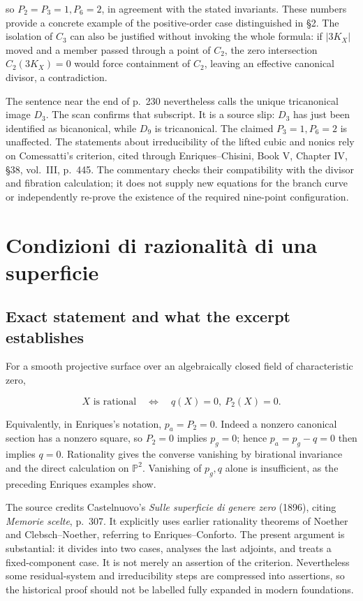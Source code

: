 so \(P_2=P_3=1,P_6=2\), in agreement with the stated invariants. These numbers provide a concrete example of the positive-order case distinguished in §2. The isolation of \(C_3\) can also be justified without invoking the whole formula: if \(|3K_X|\) moved and a member passed through a point of \(C_2\), the zero intersection \(C_2(3K_X)=0\) would force containment of \(C_2\), leaving an effective canonical divisor, a contradiction.

The sentence near the end of p.~230 nevertheless calls the unique tricanonical image \(D_3\). The scan confirms that subscript. It is a source slip: \(D_3\) has just been identified as bicanonical, while \(D_9\) is tricanonical. The claimed \(P_3=1,P_6=2\) is unaffected. The statements about irreducibility of the lifted cubic and nonics rely on Comessatti's criterion, cited through Enriques--Chisini, Book V, Chapter IV, §38, vol.~III, p.~445. The commentary checks their compatibility with the divisor and fibration calculation; it does not supply new equations for the branch curve or independently re-prove the existence of the required nine-point configuration.

\section{Condizioni di razionalit\`a di una superficie}
\label{cp1-vi-4}

\subsection{Exact statement and what the excerpt establishes}

For a smooth projective surface over an algebraically closed field of characteristic zero,

\[
X\text{ is rational}\quad\Longleftrightarrow\quad q(X)=0,\ P_2(X)=0.
\]

Equivalently, in Enriques's notation, \(p_a=P_2=0\). Indeed a nonzero canonical section has a nonzero square, so \(P_2=0\) implies \(p_g=0\); hence \(p_a=p_g-q=0\) then implies \(q=0\). Rationality gives the converse vanishing by birational invariance and the direct calculation on \(\mathbb P^2\). Vanishing of \(p_g,q\) alone is insufficient, as the preceding Enriques examples show.

The source credits Castelnuovo's \emph{Sulle superficie di genere zero} (1896), citing \emph{Memorie scelte}, p.~307. It explicitly uses earlier rationality theorems of Noether and Clebsch--Noether, referring to Enriques--Conforto. The present argument is substantial: it divides into two cases, analyses the last adjoints, and treats a fixed-component case. It is not merely an assertion of the criterion. Nevertheless some residual-system and irreducibility steps are compressed into assertions, so the historical proof should not be labelled fully expanded in modern foundations.

